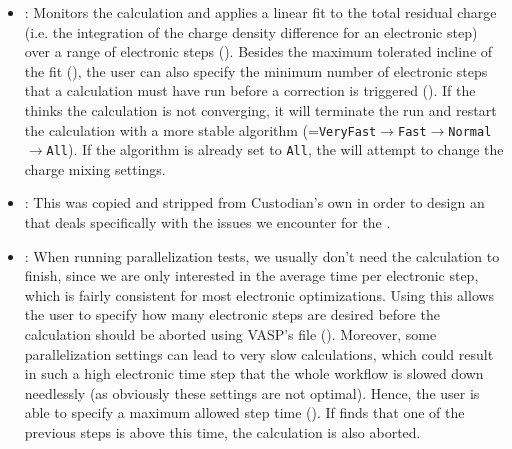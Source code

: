 \begin{refsection}
\begin{itemize} 
 
\item {}: Monitors the calculation and 
applies a linear fit to the total residual charge (i.e. the integration of the 
charge density difference for an electronic step) over a range of electronic 
steps (). Besides the maximum tolerated incline of the 
fit (), the user can also specify the minimum 
number of electronic steps that a calculation must have run before a 
correction is triggered (). If the 
 thinks the calculation is not converging, it will 
terminate the run and restart the calculation with a more stable algorithm 
(=\texttt{VeryFast}$\rightarrow$\texttt{Fast}$\rightarrow$\texttt{Normal}$\rightarrow$\texttt{All}). 
If the algorithm is already set to \texttt{All}, the 
 will attempt to change the charge mixing 
settings. 
 
 
\item {}: This  was copied and 
stripped from Custodian's own  in order to design an 
 that deals specifically with the issues we encounter for 
the . 
 
\item {}: When running parallelization tests, 
we usually don't need the calculation to finish, since we are only interested 
in the average time per electronic step, which is fairly consistent for most 
electronic optimizations. Using this  allows the user to 
specify how many electronic steps are desired before the calculation should be 
aborted using VASP's  file (). 
Moreover, some parallelization settings can lead to very slow calculations, 
which could result in such a high electronic time step that the whole workflow 
is slowed down needlessly (as obviously these settings are not optimal). 
Hence, the user is able to specify a maximum allowed step time 
(). If  finds 
that one of the previous steps is above this time, the calculation is also 
aborted. 
 

\end{itemize}
\end{refsection}
